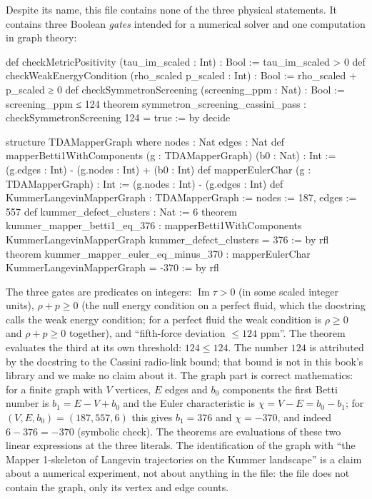 Despite its name, this file contains none of the three physical statements. It contains three
Boolean \emph{gates} intended for a numerical solver and one computation in graph theory:
\begin{leancode}
def checkMetricPositivity (tau_im_scaled : Int) : Bool :=
  tau_im_scaled > 0
def checkWeakEnergyCondition (rho_scaled p_scaled : Int) : Bool :=
  rho_scaled + p_scaled ≥ 0
def checkSymmetronScreening (screening_ppm : Nat) : Bool :=
  screening_ppm ≤ 124
theorem symmetron_screening_cassini_pass :
    checkSymmetronScreening 124 = true := by decide

structure TDAMapperGraph where
  nodes : Nat
  edges : Nat
def mapperBetti1WithComponents (g : TDAMapperGraph) (b0 : Nat) : Int :=
  (g.edges : Int) - (g.nodes : Int) + (b0 : Int)
def mapperEulerChar (g : TDAMapperGraph) : Int :=
  (g.nodes : Int) - (g.edges : Int)
def KummerLangevinMapperGraph : TDAMapperGraph := { nodes := 187, edges := 557 }
def kummer_defect_clusters : Nat := 6
theorem kummer_mapper_betti1_eq_376 :
    mapperBetti1WithComponents KummerLangevinMapperGraph kummer_defect_clusters
      = 376 := by rfl
theorem kummer_mapper_euler_eq_minus_370 :
    mapperEulerChar KummerLangevinMapperGraph = -370 := by rfl
\end{leancode}
\begin{leanbox}
The three gates are predicates on integers: $\operatorname{Im}\tau>0$ (in some scaled integer
units), $\rho+p\ge0$ (the null energy condition on a perfect fluid, which the docstring calls
the weak energy condition; for a perfect fluid the weak condition is $\rho\ge0$ and
$\rho+p\ge0$ together), and ``fifth-force deviation $\le124$ ppm''. The theorem
 evaluates the third at its own threshold:
$124\le124$. The number $124$ is attributed by the docstring to the Cassini radio-link bound;
that bound is not in this book's library and we make no claim about it. The graph part is
correct mathematics: for a finite graph with $V$ vertices, $E$ edges and $b_0$ components the
first Betti number is $b_1=E-V+b_0$ and the Euler characteristic is $\chi=V-E=b_0-b_1$; for
$(V,E,b_0)=(187,557,6)$ this gives $b_1=376$ and $\chi=-370$, and indeed $6-376=-370$
(symbolic check). The theorems are  evaluations of these two linear expressions at
the three literals. The identification of the graph with ``the Mapper 1-skeleton of Langevin
trajectories on the Kummer landscape'' is a claim about a numerical experiment, not about
anything in the file: the file does not contain the graph, only its vertex and edge counts.
\end{leanbox}


